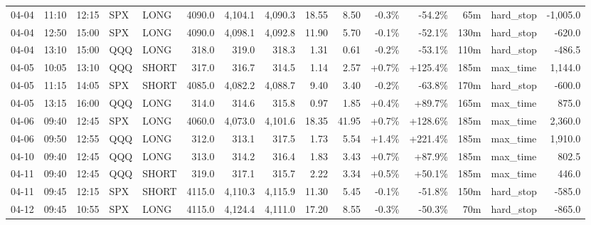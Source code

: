 \documentclass[11pt,a4paper,twoside]{article}
\begin{document}
\begin{landscape}
\begin{center}
\begin{longtable}{>{\color{txtmain}}l l l l l r r r r r r r r >{\color{txtmain}}l r}
04-04 & 11:10 & 12:15 & SPX & LONG & 4090.0 & 4,104.1 & 4,090.3 & 18.55 & 8.50 & \textcolor{lossred}{-0.3\%} & \textcolor{lossred}{-54.2\%} & 65m & hard\_stop & \textcolor{lossred}{-1,005.0} \\
04-04 & 12:50 & 15:00 & SPX & LONG & 4090.0 & 4,098.1 & 4,092.8 & 11.90 & 5.70 & \textcolor{lossred}{-0.1\%} & \textcolor{lossred}{-52.1\%} & 130m & hard\_stop & \textcolor{lossred}{-620.0} \\
04-04 & 13:10 & 15:00 & QQQ & LONG & 318.0 & 319.0 & 318.3 & 1.31 & 0.61 & \textcolor{lossred}{-0.2\%} & \textcolor{lossred}{-53.1\%} & 110m & hard\_stop & \textcolor{lossred}{-486.5} \\
04-05 & 10:05 & 13:10 & QQQ & SHORT & 317.0 & 316.7 & 314.5 & 1.14 & 2.57 & \textcolor{wingreen}{+0.7\%} & \textcolor{wingreen}{+125.4\%} & 185m & max\_time & \textcolor{wingreen}{1,144.0} \\
04-05 & 11:15 & 14:05 & SPX & SHORT & 4085.0 & 4,082.2 & 4,088.7 & 9.40 & 3.40 & \textcolor{lossred}{-0.2\%} & \textcolor{lossred}{-63.8\%} & 170m & hard\_stop & \textcolor{lossred}{-600.0} \\
04-05 & 13:15 & 16:00 & QQQ & LONG & 314.0 & 314.6 & 315.8 & 0.97 & 1.85 & \textcolor{wingreen}{+0.4\%} & \textcolor{wingreen}{+89.7\%} & 165m & max\_time & \textcolor{wingreen}{875.0} \\
04-06 & 09:40 & 12:45 & SPX & LONG & 4060.0 & 4,073.0 & 4,101.6 & 18.35 & 41.95 & \textcolor{wingreen}{+0.7\%} & \textcolor{wingreen}{+128.6\%} & 185m & max\_time & \textcolor{wingreen}{2,360.0} \\
04-06 & 09:50 & 12:55 & QQQ & LONG & 312.0 & 313.1 & 317.5 & 1.73 & 5.54 & \textcolor{wingreen}{+1.4\%} & \textcolor{wingreen}{+221.4\%} & 185m & max\_time & \textcolor{wingreen}{1,910.0} \\
04-10 & 09:40 & 12:45 & QQQ & LONG & 313.0 & 314.2 & 316.4 & 1.83 & 3.43 & \textcolor{wingreen}{+0.7\%} & \textcolor{wingreen}{+87.9\%} & 185m & max\_time & \textcolor{wingreen}{802.5} \\
04-11 & 09:40 & 12:45 & QQQ & SHORT & 319.0 & 317.1 & 315.7 & 2.22 & 3.34 & \textcolor{wingreen}{+0.5\%} & \textcolor{wingreen}{+50.1\%} & 185m & max\_time & \textcolor{wingreen}{446.0} \\
04-11 & 09:45 & 12:15 & SPX & SHORT & 4115.0 & 4,110.3 & 4,115.9 & 11.30 & 5.45 & \textcolor{lossred}{-0.1\%} & \textcolor{lossred}{-51.8\%} & 150m & hard\_stop & \textcolor{lossred}{-585.0} \\
04-12 & 09:45 & 10:55 & SPX & LONG & 4115.0 & 4,124.4 & 4,111.0 & 17.20 & 8.55 & \textcolor{lossred}{-0.3\%} & \textcolor{lossred}{-50.3\%} & 70m & hard\_stop & \textcolor{lossred}{-865.0} \\

\end{longtable}
\end{center}
\end{landscape}
\end{document}
